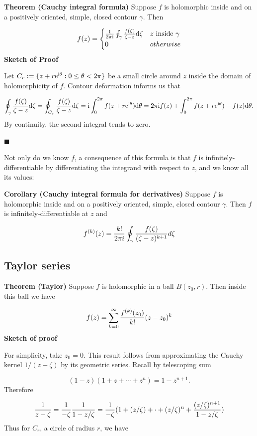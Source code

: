 \documentclass[12pt,a4paper]{article}
\def\D{ {\rm d} }
\def\I{ {\rm i} }
\def\E{ {\rm e} }
\def\mdblksquare{\blacksquare}
\begin{document}
\textbf{Theorem (Cauchy integral formula)} Suppose $f$ is holomorphic inside and on a positively oriented, simple, closed contour $\gamma$. Then

\[
f(z) = \begin{cases} 
{1 \over 2 \pi \I} \oint_\gamma {f(\zeta) \over \zeta - z} \D \zeta & z \hbox{ inside $\gamma$} \\
0 & otherwise 
\end{cases}
\]
\textbf{Sketch of Proof}

Let $C_r := \{ z + r \E^{\I \theta} : 0 \leq \theta < 2\pi \}$ be a small circle around $z$ inside the domain of holomorphicity of $f$.  Contour deformation informs us that 

\[
\oint_\gamma {f(\zeta) \over \zeta - z} \D \zeta  = 
\oint_{C_r} {f(\zeta) \over \zeta - z} \D \zeta =
\I \int_0^{2 \pi} f(z + r \E^{\I \theta})\D \theta = 
2 \pi \I f(z) + \int_0^{2 \pi} {f(z + r \E^{\I \theta}) - f(z)} \D \theta.
\]
By continuity, the second integral tends to zero.

\ensuremath{\mdblksquare}

Not only do we know $f$, a consequence of this formula is  that $f$ is infinitely-differentiable by differentiating the integrand with respect to $z$, and we know all its values:

\textbf{Corollary (Cauchy integral formula for derivatives)} Suppose $f$ is holomorphic inside and on a positively oriented, simple, closed contour $\gamma$. Then $f$ is infinitely-differentiable at $z$ and 

\[
f^{(k)}(z) = {k! \over 2 \pi i} \oint_\gamma {f(\zeta) \over (\zeta - z)^{k+1}} d \zeta
\]
\subsection{Taylor series}
\textbf{Theorem (Taylor)} Suppose $f$ is holomorphic in a ball $B(z_0,r)$. Then inside this ball we have

\[
    f(z) = \sum_{k=0}^\infty {f^{(k)}(z_0) \over k!} (z-z_0)^k
\]
\textbf{Sketch of proof}

For simplicity, take $z_0 = 0$.  This result follows from approximating the Cauchy kernel $1/(z - \zeta)$ by its geometric series. Recall by telescoping sum

\[
(1-z) (1 + z + \cdots + z^n) = 1 - z^{n+1}.
\]
Therefore

\[
{1 \over z - \zeta} = {1 \over -\zeta} {1 \over 1 - z/\zeta} = {1 \over - \zeta} (1 + (z/\zeta) + \cdot + (z/\zeta)^n + {(z/\zeta)^{n+1} \over 1 - z/\zeta})
\]
Thus for $C_r$, a circle of radius $r$, we have
\end{document}
